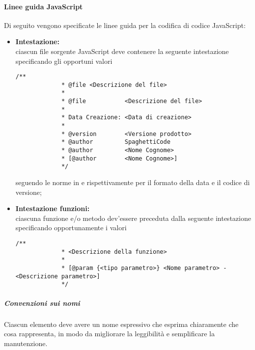 \paragraph{Linee guida JavaScript}
\label{par:convenzioni_javascript}

Di seguito vengono specificate le linee guida per la codifica di codice JavaScript:
\begin{itemize}
	\item \textbf{Intestazione:} \\
		ciascun file sorgente JavaScript deve contenere la seguente intestazione specificando gli opportuni valori
		\begin{lstlisting}[style=htmlcssjs]
			/**
	 	 	 * @file <Descrizione del file>
	 	 	 * 
	 	 	 * @file           <Descrizione del file>
	 	 	 *
	 	 	 * Data Creazione: <Data di creazione>
	 	 	 *
	 	 	 * @version        <Versione prodotto>
	 	 	 * @author         SpaghettiCode
	 	 	 * @author         <Nome Cognome>
	 	 	 * [@author        <Nome Cognome>]
	 	 	 */
		\end{lstlisting}
		seguendo le norme in  e  rispettivamente per il formato della data e il codice di versione;
	\item \textbf{Intestazione funzioni:} \\
		ciascuna funzione e/o metodo dev'essere preceduta dalla seguente intestazione specificando opportunamente i valori
		\begin{lstlisting}[style=htmlcssjs]
			/**
			 * <Descrizione della funzione>
			 *
			 * [@param {<tipo parametro>} <Nome parametro> - <Descrizione parametro>]
			 */
		\end{lstlisting}
\end{itemize}

\subparagraph{Convenzioni sui nomi}

Ciascun elemento deve avere un nome espressivo che esprima chiaramente che cosa rappresenta, in modo da migliorare la leggibilità e 
semplificare la manutenzione.

